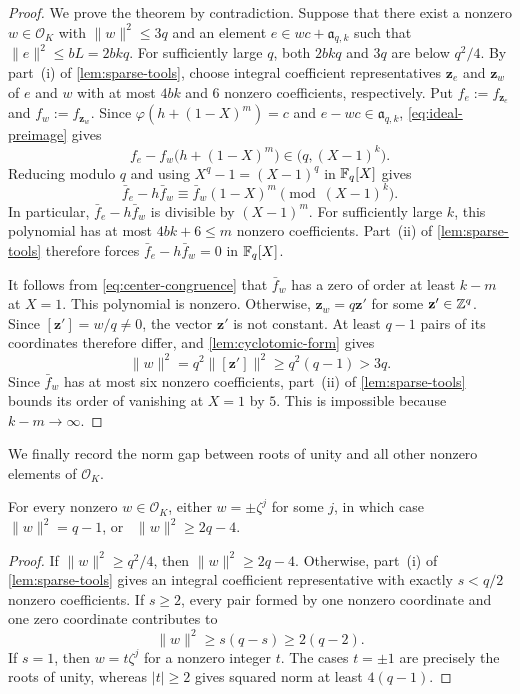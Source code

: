 \begin{proof}
We prove the theorem by contradiction.  Suppose that there exist a nonzero
$w\in\mathcal{O}_K$ with $\|w\|^2\le3q$ and an element
$e\in wc+\mathfrak a_{q,k}$ such that
$\|e\|^2\le bL=2bkq$.  For sufficiently large $q$, both $2bkq$ and $3q$ are
below $q^2/4$.  By part~(i) of \cref{lem:sparse-tools}, choose integral
coefficient representatives $\mathbf z_e$ and $\mathbf z_w$ of $e$ and $w$
with at most $4bk$ and $6$ nonzero coefficients, respectively.  Put
$f_e:=f_{\mathbf z_e}$ and $f_w:=f_{\mathbf z_w}$.  Since
$\varphi(h+(1-X)^m)=c$ and $e-wc\in\mathfrak a_{q,k}$,
\cref{eq:ideal-preimage} gives
\[
 f_e-f_w\bigl(h+(1-X)^m\bigr)\in\bigl(q,(X-1)^k\bigr).
\]
Reducing modulo $q$ and using $X^q-1=(X-1)^q$ in $\mathbb F_q[X]$ gives
\begin{equation}
\label{eq:center-congruence}
 \bar f_e-h\bar f_w
 \equiv\bar f_w(1-X)^m\pmod{(X-1)^k}.
\end{equation}
In particular, $\bar f_e-h\bar f_w$ is divisible by $(X-1)^m$.
For sufficiently large $k$, this polynomial has at most $4bk+6\le m$ nonzero
coefficients.  Part~(ii) of \cref{lem:sparse-tools} therefore forces
$\bar f_e-h\bar f_w=0$ in $\mathbb F_q[X]$.

It follows from \cref{eq:center-congruence} that
$\bar f_w$ has a zero of order at least $k-m$ at $X=1$.  This polynomial is
nonzero.  Otherwise, $\mathbf z_w=q\mathbf z'$ for some $\mathbf z'\in\mathbb Z^q$.
Since $[\mathbf z']=w/q\ne0$, the vector $\mathbf z'$ is not constant.  At
least $q-1$ pairs of its coordinates therefore differ, and
\cref{lem:cyclotomic-form} gives
\[
 \|w\|^2=q^2\|[\mathbf z']\|^2\ge q^2(q-1)>3q.
\]
Since $\bar f_w$ has at most six nonzero coefficients, part~(ii) of
\cref{lem:sparse-tools} bounds its order of vanishing at $X=1$ by $5$.  This
is impossible because $k-m\to\infty$.
\end{proof}

We finally record the norm gap between roots of unity and all other
nonzero elements of $\mathcal{O}_K$.
\begin{lemma}
\label{lem:second-shell}
For every nonzero $w\in\mathcal{O}_K$, either
$w=\pm\zeta^j$ for some $j$, in which case $\|w\|^2=q-1$, or~
$\|w\|^2\ge2q-4$.
\end{lemma}

\begin{proof}
If $\|w\|^2\ge q^2/4$, then $\|w\|^2\ge2q-4$.  Otherwise,
part~(i) of
\cref{lem:sparse-tools} gives an integral coefficient representative with
exactly $s<q/2$ nonzero coefficients.  If $s\ge2$, every pair formed by one
nonzero coordinate and one zero coordinate contributes to
\[
 \|w\|^2\ge s(q-s)\ge2(q-2).
\]
If $s=1$, then $w=t\zeta^j$ for a nonzero integer $t$.  The cases
$t=\pm1$ are precisely the roots of unity, whereas $|t|\ge2$ gives squared
norm at least $4(q-1)$.
\end{proof}
